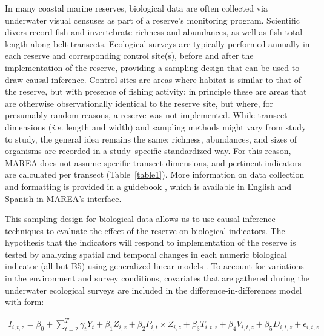 \documentclass[10pt,letterpaper]{article}
\begin{document}
In many coastal marine reserves, biological data are often collected via underwater visual censuses as part of a reserve's monitoring program. Scientific divers record fish and invertebrate richness and abundances, as well as fish total length along belt transects. Ecological surveys are typically performed annually in each reserve and corresponding control site(s), before and after the implementation of the reserve, providing a sampling design that can be used to draw causal inference. Control sites are areas where habitat is similar to that of the reserve, but with presence of fishing activity; in principle these are areas that are otherwise observationally identical to the reserve site, but where, for presumably random reasons, a reserve was not implemented. While transect dimensions (\emph{i.e.} length and width) and sampling methods might vary from study to study, the general idea remains the same: richness, abundances, and sizes of organisms are recorded in a study--specific standardized way. For this reason, MAREA does not assume specific transect dimensions, and pertinent indicators are calculated per transect (Table~\ref{table1}). More information on data collection and formatting is provided in a guidebook \cite{villaseorderbez2017-xE}, which is available in English and Spanish in MAREA's interface.

This sampling design for biological data allows us to use causal inference techniques \cite{moland_2013-VP,ferraro_2006-oW} to evaluate the effect of the reserve on biological indicators. The hypothesis that the indicators will respond to implementation of the reserve is tested by analyzing spatial and temporal changes in each numeric biological indicator (all but B5) using generalized linear models \cite{moland_2013-VP}. To account for variations in the environment and survey conditions, covariates that are gathered during the underwater ecological surveys are included in the difference-in-differences model with form:

\begin{eqnarray}
\label{eq:difindif}
I_{i,t,z}=\beta_0 + \sum_{t = 2}^T\gamma_{t}Y_t + \beta_1Z_{i,z} + \beta_2P_{i,t}\times Z_{i,z} + \beta_3T_{i,t,z} + \beta_4V_{i,t,z} + \beta_5D_{i,t,z} + \epsilon_{i,t,z}
\end{eqnarray}
\end{document}
